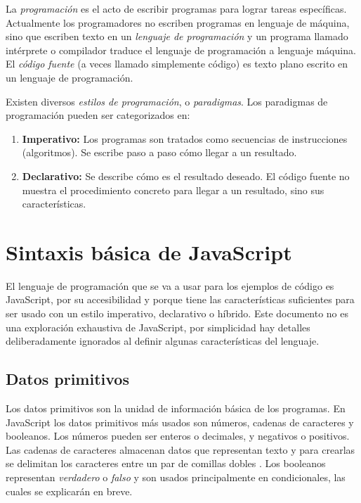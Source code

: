 \documentclass{article}
\newcommand{\code}[1]{\tcbox{\texttt{#1}}}
\begin{document}
La \textit{programación} es el acto de escribir programas para lograr tareas específicas. Actualmente los programadores no escriben programas en lenguaje de máquina, sino que escriben texto en un \textit{lenguaje de programación} y un programa llamado intérprete o compilador traduce el lenguaje de programación a lenguaje máquina\cite{compilers-and-interpreters}. El \textit{código fuente} (a veces llamado simplemente código) es texto plano escrito en un lenguaje de programación.

Existen diversos \textit{estilos de programación}, o \textit{paradigmas}. Los paradigmas de programación pueden ser categorizados en:
\begin{enumerate}
  \item \textbf{Imperativo:} Los programas son tratados como secuencias de instrucciones (algoritmos). Se escribe paso a paso cómo llegar a un resultado.
  \item \textbf{Declarativo:} Se describe cómo es el resultado deseado. El código fuente no muestra el procedimiento concreto para llegar a un resultado, sino sus características.
\end{enumerate}


\section{Sintaxis básica de JavaScript}
El lenguaje de programación que se va a usar para los ejemplos de código es JavaScript, por su accesibilidad y porque tiene las características suficientes para ser usado con un estilo imperativo, declarativo o híbrido\cite{why-js}. Este documento no es una exploración exhaustiva de JavaScript, por simplicidad hay detalles deliberadamente ignorados al definir algunas características del lenguaje.

\subsection{Datos primitivos}
Los datos primitivos son la unidad de información básica de los programas. En JavaScript los datos primitivos más usados son números, cadenas de caracteres y booleanos. Los números pueden ser enteros o decimales, y negativos o positivos. Las cadenas de caracteres almacenan datos que representan texto y para crearlas se delimitan los caracteres entre un par de comillas dobles \code{\textquotedbl\textquotedbl}. Los booleanos representan \textit{verdadero} o \textit{falso} y son usados principalmente en condicionales, las cuales se explicarán en breve.
\end{document}
